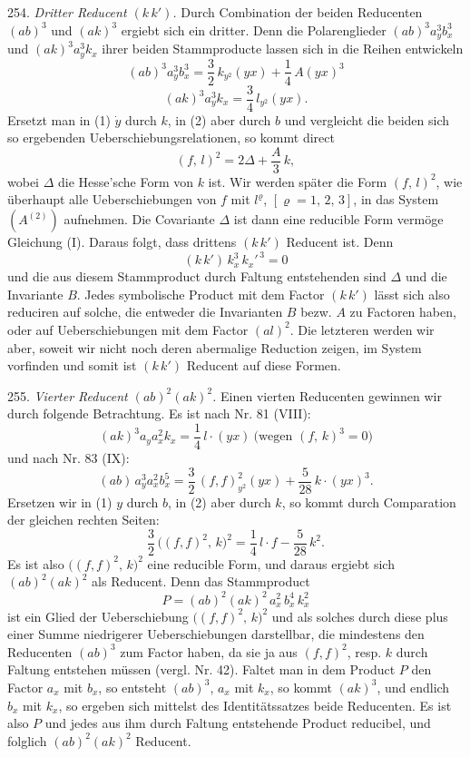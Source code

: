 \documentclass[11pt]{article}
\providecommand{\weberpage}[1]{}
\providecommand{\weq}[2]{\begin{equation}\tag{#1}#2\end{equation}}
\begin{document}
254. \textit{Dritter Reducent $(k\,k')$.} Durch Combination der beiden
Reducenten $(ab)^3$ und $(ak)^3$ ergiebt sich ein dritter. Denn die
Polarenglieder $(ab)^3 a_y^3 b_x^3$ und $(ak)^3 a_y^3 k_x$ ihrer beiden
Stammproducte lassen sich in die Reihen entwickeln
\weq{1}{(ab)^3 a_y^3 b_x^3 = \frac{3}{2}\,k_{y^2}(yx) + \frac{1}{4}\,A(yx)^3}
\weq{2}{(ak)^3 a_y^3 k_x = \frac{3}{4}\,l_{y^2}(yx).}
Ersetzt man in (1) $\dot{y}$ durch $k$, in (2) aber durch $b$ und
vergleicht die beiden sich so ergebenden Ueberschiebungsrelationen, so
kommt direct
\weq{I}{(f,\,l)^2 = 2\varDelta + \frac{A}{3}\,k,}
wobei $\varDelta$ die Hesse'sche Form von $k$ ist. Wir werden später die
Form $(f,\,l)^2$, wie überhaupt alle Ueberschiebungen von $f$ mit
$l^\varrho$, $[\varrho = 1,\,2,\,3]$, in das System $(A^{(2)})$ aufnehmen.
Die Covariante $\varDelta$ ist dann eine reducible Form vermöge Gleichung
(I). Daraus folgt, dass drittens $(k\,k')$ Reducent ist. Denn
\[
(k\,k')\,k_x^3\,k_x'^{\,3} = 0
\]
und die aus diesem Stammproduct durch Faltung entstehenden sind
$\varDelta$ und die Invariante $B$. Jedes symbolische Product mit dem
Factor $(k\,k')$ lässt sich also reduciren auf solche, die entweder die
Invarianten $B$ bezw. $A$ zu Factoren haben, oder auf Ueberschiebungen
mit dem Factor $(al)^2$. Die letzteren werden wir aber, soweit wir nicht
noch deren abermalige Reduction zeigen, im System vorfinden und somit
ist $(k\,k')$ Reducent auf diese Formen.


\weberpage{278}

255. \textit{Vierter Reducent $(ab)^2(ak)^2$.} Einen vierten Reducenten
gewinnen wir durch folgende Betrachtung. Es ist nach Nr. 81 (VIII):
\weq{1}{(ak)^3 a_y a_x^2 k_x = \frac{1}{4}\,l\cdot(yx)\ \text{(wegen }(f,\,k)^3=0\text{)}}
und nach Nr. 83 (IX):
\weq{2}{(ab)\,a_y^3 a_x^2 b_x^5 = \frac{3}{2}\,(f,f)^2_{y^2}(yx) + \frac{5}{28}\,k\cdot(yx)^3.}
Ersetzen wir in (1) $y$ durch $b$, in (2) aber durch $k$, so kommt durch
Comparation der gleichen rechten Seiten:
\weq{II}{\frac{3}{2}\,\big((f,f)^2,\,k\big)^2 = \frac{1}{4}\,l\cdot f - \frac{5}{28}\,k^2.}
Es ist also $\big((f,f)^2,\,k\big)^2$ eine reducible Form, und daraus
ergiebt sich $(ab)^2(ak)^2$ als Reducent. Denn das Stammproduct
\[
P = (ab)^2(ak)^2\,a_x^2\,b_x^4\,k_x^2
\]
ist ein Glied der Ueberschiebung $\big((f,f)^2,\,k\big)^2$ und als
solches durch diese plus einer Summe niedrigerer Ueberschiebungen
darstellbar, die mindestens den Reducenten $(ab)^3$ zum Factor haben,
da sie ja aus $(f,f)^2$, resp. $k$ durch Faltung entstehen müssen (vergl.
Nr. 42). Faltet man in dem Product $P$ den Factor $a_x$ mit $b_x$, so
entsteht $(ab)^3$, $a_x$ mit $k_x$, so kommt $(ak)^3$, und endlich $b_x$
mit $k_x$, so ergeben sich mittelst des Identitätssatzes beide
Reducenten. Es ist also $P$ und jedes aus ihm durch Faltung entstehende
Product reducibel, und folglich $(ab)^2(ak)^2$ Reducent.
\end{document}

